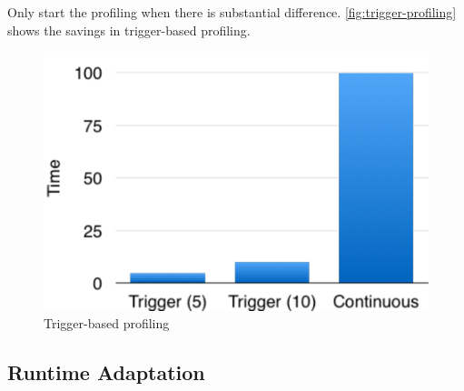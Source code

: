  Only start the profiling when there is
substantial difference. \autoref{fig:trigger-profiling} shows the savings in
trigger-based profiling.

\begin{figure}
  \centering
  \includegraphics[width=\columnwidth]{figures/trigger.pdf}
  \caption{Trigger-based profiling}
  \label{fig:trigger}
\end{figure}

\subsection{Runtime Adaptation}
\label{sec:runtime-adaptation}

